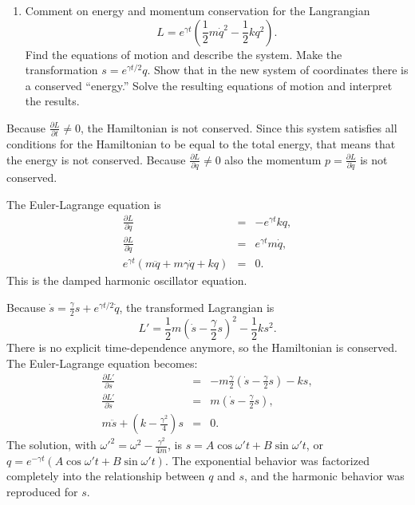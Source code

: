\documentclass[letterpaper,11pt]{article}
\begin{document}
\begin{enumerate}[resume]
 \item Comment on energy and momentum conservation for the Langrangian
 \begin{equation*}
  L = e^{\gamma t} \left( \frac{1}{2}m \dot{q}^2 - \frac{1}{2}k q^2 \right).
 \end{equation*}
 Find the equations of motion and describe the system.  Make the transformation $s = e^{\gamma t/2}q$.  Show that in the new system of coordinates there is a conserved ``energy.''  Solve the resulting equations of motion and interpret the results.
\end{enumerate}

Because $\frac{\partial L}{\partial t} \ne 0$, the Hamiltonian is not conserved.  Since this system satisfies all conditions for the Hamiltonian to be equal to the total energy, that means that the energy is not conserved.  Because $\frac{\partial L}{\partial q} \ne 0$ also the momentum $p = \frac{\partial L}{\partial \dot{q}}$ is not conserved.

The Euler-Lagrange equation is
\begin{eqnarray*}
 \frac{\partial L}{\partial q} & = & - e^{\gamma t} k q, \\
 \frac{\partial L}{\partial \dot{q}} & = & e^{\gamma t} m \dot{q}, \\
 e^{\gamma t} (m \ddot{q} + m \gamma \dot{q} + k q) & = & 0.
\end{eqnarray*}
This is the damped harmonic oscillator equation.

Because $\dot{s} = \frac{\gamma}{2}s + e^{\gamma t/2} \dot{q}$, the transformed Lagrangian is
\begin{equation*}
 L' = \frac{1}{2}m (\dot{s} - \frac{\gamma}{2} s)^2 - \frac{1}{2}k s^2.
\end{equation*}
There is no explicit time-dependence anymore, so the Hamiltonian is conserved.  The Euler-Lagrange equation becomes:
\begin{eqnarray*}
 \frac{\partial L'}{\partial s} & = & - m \frac{\gamma}{2} (\dot{s} - \frac{\gamma}{2} s) - k s, \\
 \frac{\partial L'}{\partial \dot{s}} & = & m (\dot{s} - \frac{\gamma}{2} s), \\
 m \ddot{s} + (k - \frac{\gamma^2}{4}) s & = & 0.
\end{eqnarray*}
The solution, with $\omega'^2 = \omega^2 - \frac{\gamma^2}{4m}$, is $s = A \cos \omega' t + B \sin \omega' t$, or $q = e^{-\gamma t} (A \cos \omega' t + B \sin \omega' t)$.  The exponential behavior was factorized completely into the relationship between $q$ and $s$, and the harmonic behavior was reproduced for $s$.
\end{document}
